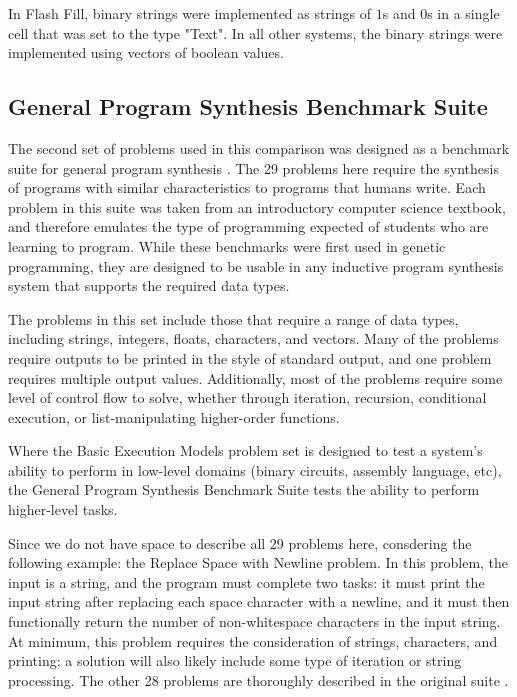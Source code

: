 In Flash Fill, binary strings were implemented as strings of $1$s and $0$s in a single cell that was set to the type "Text". In all other systems, the binary strings were implemented using vectors of boolean values.


\subsection{General Program Synthesis Benchmark Suite}
The second set of problems used in this comparison was designed as a benchmark suite for general program synthesis \cite{Helmuth2015b}. The 29 problems here require the synthesis of programs with similar characteristics to programs that humans write. Each problem in this suite was taken from an introductory computer science textbook, and therefore emulates the type of programming expected of students who are learning to program. While these benchmarks were first used in genetic programming, they are designed to be usable in any inductive program synthesis system that supports the required data types.

The problems in this set include those that require a range of data types, including strings, integers, floats, characters, and vectors. Many of the problems require outputs to be printed in the style of standard output, and one problem requires multiple output values. Additionally, most of the problems require some level of control flow to solve, whether through iteration, recursion, conditional execution, or list-manipulating higher-order functions.

Where the Basic Execution Models problem set is designed to test a system's ability to perform in low-level domains (binary circuits, assembly language, etc), the General Program Synthesis Benchmark Suite tests the ability to perform higher-level tasks.

Since we do not have space to describe all 29 problems here, consdering the following example: the Replace Space with Newline problem. In this problem, the input is a string, and the program must complete two tasks: it must print the input string after replacing each space character with a newline, and it must then functionally return the number of non-whitespace characters in the input string. At minimum, this problem requires the consideration of strings, characters, and printing; a solution will also likely include some type of iteration or string processing. The other 28 problems are thoroughly described in the original suite \cite{Helmuth2015b}.

